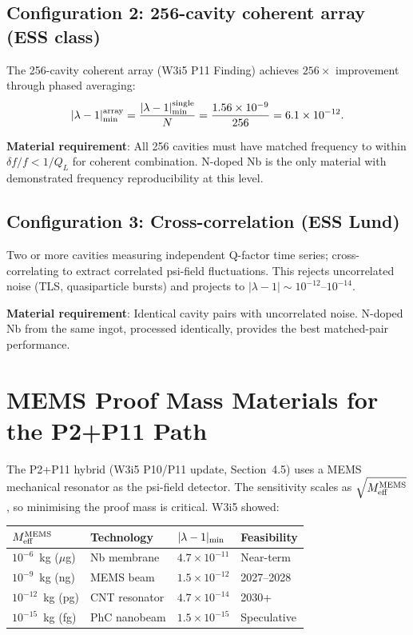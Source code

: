 \documentclass[11pt]{article}
\theoremstyle{definition}
\theoremstyle{remark}
\newcommand{\ee}[1]{\times 10^{#1}}
\newcommand{\Meff}{M_{\rm eff}}
\newcommand{\lambdabound}{1.56\ee{-9}}
\newcommand{\lam}{|\lambda-1|}
\begin{document}
\subsection{Configuration 2: 256-cavity coherent array (ESS class)}

The 256-cavity coherent array (W3i5 P11 Finding) achieves $256\times$
improvement through phased averaging:
\begin{equation}
  \lam_{\rm min}^{\rm array} = \frac{\lam_{\rm min}^{\rm single}}{N}
  = \frac{\lambdabound}{256} = 6.1\ee{-12}.
\end{equation}

\textbf{Material requirement}: All 256 cavities must have matched
frequency to within $\delta f/f < 1/Q_L$ for coherent combination.
N-doped Nb is the only material with demonstrated frequency
reproducibility at this level.

\subsection{Configuration 3: Cross-correlation (ESS Lund)}

Two or more cavities measuring independent Q-factor time series;
cross-correlating to extract correlated psi-field fluctuations.
This rejects uncorrelated noise (TLS, quasiparticle bursts) and
projects to $\lam \sim 10^{-12}$--$10^{-14}$.

\textbf{Material requirement}: Identical cavity pairs with
uncorrelated noise. N-doped Nb from the same ingot, processed
identically, provides the best matched-pair performance.


\section{MEMS Proof Mass Materials for the P2+P11 Path}
\label{sec:mems}

The P2+P11 hybrid (W3i5 P10/P11 update, Section~4.5) uses a MEMS
mechanical resonator as the psi-field detector. The sensitivity scales
as $\sqrt{\Meff^{\rm MEMS}}$, so minimising the proof mass is critical.
W3i5 showed:

\begin{center}
\begin{tabular}{llll}
\toprule
$\Meff^{\rm MEMS}$ & Technology & $\lam_{\rm min}$ & Feasibility \\
\midrule
$10^{-6}$~kg ($\mu$g) & Nb membrane & $4.7\ee{-11}$ & Near-term \\
$10^{-9}$~kg (ng) & MEMS beam & $1.5\ee{-12}$ & 2027--2028 \\
$10^{-12}$~kg (pg) & CNT resonator & $4.7\ee{-14}$ & 2030+ \\
$10^{-15}$~kg (fg) & PhC nanobeam & $1.5\ee{-15}$ & Speculative \\
\bottomrule
\end{tabular}
\end{center}
\end{document}
